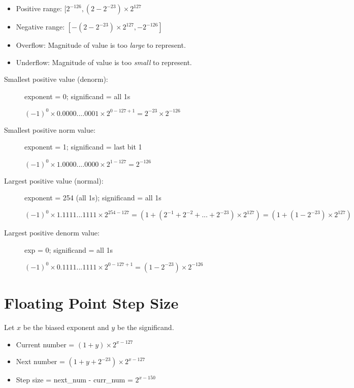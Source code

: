 \begin{itemize}
    \item Positive range: \([2^{-126}, (2 - 2^{-23}) \times 2^{127}\)
    \item Negative range: \([-(2 - 2^{-23}) \times 2^{127}, -2^{-126}]\)
    \item Overflow: Magnitude of value is too \emph{large} to represent.
    \item Underflow: Magnitude of value is too \emph{small} to represent.
\end{itemize}

\begin{description}
    \item[Smallest positive value (denorm):] exponent = 0; significand = all 1s
    
    \((-1)^0 \times 0.0000....0001 \times 2^{0 - 127 + 1} = 2^{-23} \times 2^{-126}\)
    
    \item[Smallest positive norm value:] exponent = 1; significand = last bit 1
    
    \((-1)^0 \times 1.0000....0000 \times 2^{1-127} = 2^{-126}\) 
    
    \item[Largest positive value (normal):] exponent = 254 (all 1s); significand = all 1s
    
    \((-1)^0 \times 1.1111...1111 \times 2^{254 - 127} = (1 + (2^{-1} + 2^{-2} + ... + 2^{-23}) \times 2^{127}) = (1 + (1 - 2^{-23}) \times 2^{127})\)
    
    \item[Largest positive denorm value:] exp = 0; significand = all 1s
    
    \((-1)^0 \times 0.1111...1111 \times 2^{0 - 127 + 1} = (1 - 2^{-23}) \times 2^{-126}\)
\end{description}

\section{Floating Point Step Size}
Let $x$ be the biased exponent and $y$ be the significand. 
\begin{itemize}
    \item Current number = \((1+y) \times 2^{x - 127}\)
    \item Next number = \((1+y + 2^{-23}) \times 2^{x - 127}\)
    \item Step size = next\_num - curr\_num = \(2^{x-150}\)
\end{itemize}

